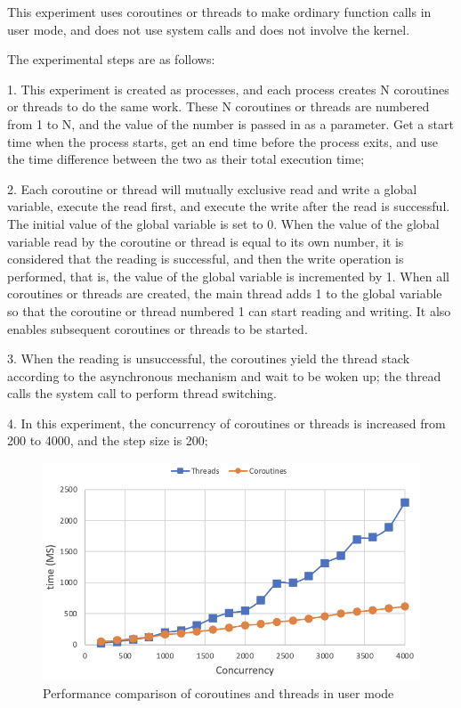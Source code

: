 \documentclass[10pt]{article}
\begin{document}
This experiment uses coroutines or threads to make ordinary function calls in user mode, and does not use system calls and does not involve the kernel.

The experimental steps are as follows:

1. This experiment is created as processes, and each process creates N coroutines or threads to do the same work. These N coroutines or threads are numbered from 1 to N, and the value of the number is passed in as a parameter. Get a start time when the process starts, get an end time before the process exits, and use the time difference between the two as their total execution time;

2. Each coroutine or thread will mutually exclusive read and write a global variable, execute the read first, and execute the write after the read is successful. The initial value of the global variable is set to 0. When the value of the global variable read by the coroutine or thread is equal to its own number, it is considered that the reading is successful, and then the write operation is performed, that is, the value of the global variable is incremented by 1. When all coroutines or threads are created, the main thread adds 1 to the global variable so that the coroutine or thread numbered 1 can start reading and writing. It also enables subsequent coroutines or threads to be started.

3. When the reading is unsuccessful, the coroutines yield the thread stack according to the asynchronous mechanism and wait to be woken up; the thread calls the system call to perform thread switching.

4. In this experiment, the concurrency of coroutines or threads is increased from 200 to 4000, and the step size is 200;

\begin{figure}[ht]
\begin{center}
\centerline{\includegraphics[width=\columnwidth]{user.png}}
\caption{Performance comparison of coroutines and threads in user mode}
\label{user}
\end{center}
\end{figure}
\end{document}
